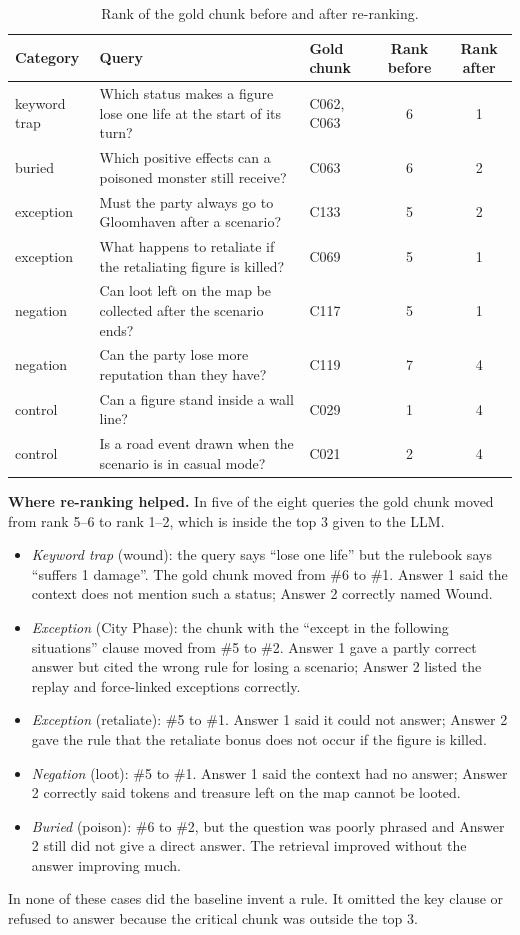 ﻿\documentclass[11pt]{article}
\begin{document}
\begin{table}[H]
\centering
\small
\begin{tabular}{lp{6cm}lcc}
\toprule
Category & Query & Gold chunk & Rank before & Rank after \\
\midrule
keyword trap & Which status makes a figure lose one life at the start of its turn? & C062, C063 & 6 & 1 \\
buried & Which positive effects can a poisoned monster still receive? & C063 & 6 & 2 \\
exception & Must the party always go to Gloomhaven after a scenario? & C133 & 5 & 2 \\
exception & What happens to retaliate if the retaliating figure is killed? & C069 & 5 & 1 \\
negation & Can loot left on the map be collected after the scenario ends? & C117 & 5 & 1 \\
negation & Can the party lose more reputation than they have? & C119 & 7 & 4 \\
control & Can a figure stand inside a wall line? & C029 & 1 & 4 \\
control & Is a road event drawn when the scenario is in casual mode? & C021 & 2 & 4 \\
\bottomrule
\end{tabular}
\caption{Rank of the gold chunk before and after re-ranking.}
\end{table}

\noindent\textbf{Where re-ranking helped.} In five of the eight queries the gold chunk moved from rank 5--6 to rank 1--2, which is inside the top 3 given to the LLM.
\begin{itemize}
\item \emph{Keyword trap} (wound): the query says ``lose one life'' but the rulebook says ``suffers 1 damage''. The gold chunk moved from \#6 to \#1. Answer 1 said the context does not mention such a status; Answer 2 correctly named Wound.
\item \emph{Exception} (City Phase): the chunk with the ``except in the following situations'' clause moved from \#5 to \#2. Answer 1 gave a partly correct answer but cited the wrong rule for losing a scenario; Answer 2 listed the replay and force-linked exceptions correctly.
\item \emph{Exception} (retaliate): \#5 to \#1. Answer 1 said it could not answer; Answer 2 gave the rule that the retaliate bonus does not occur if the figure is killed.
\item \emph{Negation} (loot): \#5 to \#1. Answer 1 said the context had no answer; Answer 2 correctly said tokens and treasure left on the map cannot be looted.
\item \emph{Buried} (poison): \#6 to \#2, but the question was poorly phrased and Answer 2 still did not give a direct answer. The retrieval improved without the answer improving much.
\end{itemize}
In none of these cases did the baseline invent a rule. It omitted the key clause or refused to answer because the critical chunk was outside the top 3.
\end{document}
